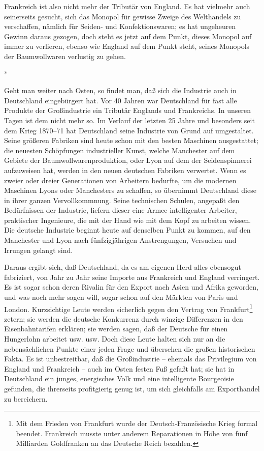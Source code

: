 \documentclass{scrbook}
\begin{document}
Frankreich ist also nicht mehr der Tributär von England. Es hat vielmehr auch seinerseits gesucht, sich das Monopol für gewisse Zweige des Welthandels zu verschaffen, nämlich für Seiden- und Konfektionswaren; es hat ungeheuren Gewinn daraus gezogen, doch steht es jetzt auf dem Punkt, dieses Monopol auf immer zu verlieren, ebenso wie England auf dem Punkt steht, seines Monopols der Baumwollwaren verlustig zu gehen.

\begin{center}*\end{center}

Geht man weiter nach Osten, so findet man, daß sich die Industrie auch in Deutschland eingebürgert hat. Vor 40 Jahren war Deutschland für fast alle Produkte der Großindustrie ein Tributär Englands und Frankreichs. In unseren Tagen ist dem nicht mehr so. Im Verlauf der letzten 25 Jahre und besonders seit dem Krieg 1870–71 hat Deutschland seine Industrie von Grund auf umgestaltet. Seine größeren Fabriken sind heute schon mit den besten Maschinen ausgestattet; die neuesten Schöpfungen industrieller Kunst, welche Manchester auf dem Gebiete der Baumwollwarenproduktion, oder Lyon auf dem der Seidenspinnerei aufzuweisen hat, werden in den neuen deutschen Fabriken verwertet. Wenn es zweier oder dreier Generationen von Arbeitern bedurfte, um die modernen Maschinen Lyons oder Manchesters zu schaffen, so übernimmt Deutschland diese in ihrer ganzen Vervollkommnung. Seine technischen Schulen, angepaßt den Bedürfnissen der Industrie, liefern dieser eine Armee intelligenter Arbeiter, praktischer Ingenieure, die mit der Hand wie mit dem Kopf zu arbeiten wissen. Die deutsche Industrie beginnt heute auf denselben Punkt zu kommen, auf den Manchester und Lyon nach fünfzigjährigen Anstrengungen, Versuchen und Irrungen gelangt sind.

Daraus ergibt sich, daß Deutschland, da es am eigenen Herd alles ebensogut fabriziert, von Jahr zu Jahr seine Importe aus Frankreich und England verringert. Es ist sogar schon deren Rivalin für den Export nach Asien und Afrika geworden, und was noch mehr sagen will, sogar schon auf den Märkten von Paris und London. Kurzsichtige Leute werden sicherlich gegen den Vertrag von Frankfurt\footnote{Mit dem Frieden von Frankfurt wurde der Deutsch-Französische Krieg formal beendet. Frankreich musste unter anderem Reparationen in Höhe von fünf Milliarden Goldfranken an das Deutsche Reich bezahlen.} zetern; sie werden die deutsche Konkurrenz durch winzige Differenzen in den Eisenbahntarifen erklären; sie werden sagen, daß der Deutsche für einen Hungerlohn arbeitet usw. usw. Doch diese Leute halten sich nur an die nebensächlichen Punkte einer jeden Frage und übersehen die großen historischen Fakta. Es ist unbestreitbar, daß die Großindustrie – ehemals das Privilegium von England und Frankreich – auch im Osten festen Fuß gefaßt hat; sie hat in Deutschland ein junges, energisches Volk und eine intelligente Bourgeoisie gefunden, die ihrerseits profitgierig genug ist, um sich gleichfalls am Exporthandel zu bereichern.
\end{document}
